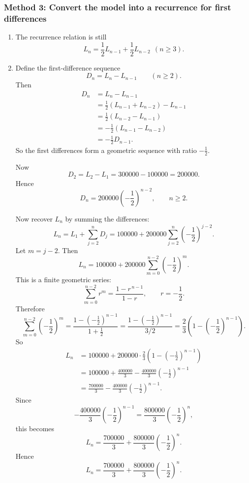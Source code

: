 \documentclass[12pt]{article}
\begin{document}
\subsubsection*{Method 3: Convert the model into a recurrence for first differences}
\begin{enumerate}[label=(\alph*)]
\item The recurrence relation is still
\[
\boxed{L_n=\frac12 L_{n-1}+\frac12 L_{n-2}\ \ (n\ge 3).}
\]

\item Define the first-difference sequence
\[
D_n=L_n-L_{n-1}\qquad (n\ge 2).
\]
Then
\begin{align*}
D_n
&=L_n-L_{n-1}\\
&=\frac12(L_{n-1}+L_{n-2})-L_{n-1}\\
&=\frac12(L_{n-2}-L_{n-1})\\
&=-\frac12(L_{n-1}-L_{n-2})\\
&=-\frac12 D_{n-1}.
\end{align*}
So the first differences form a geometric sequence with ratio \(-\tfrac12\).

Now
\[
D_2=L_2-L_1=300000-100000=200000.
\]
Hence
\[
D_n=200000\left(-\frac12\right)^{n-2}, \qquad n\ge 2.
\]

Now recover \(L_n\) by summing the differences:
\[
L_n=L_1+\sum_{j=2}^{n} D_j
=100000+200000\sum_{j=2}^{n}\left(-\frac12\right)^{j-2}.
\]
Let \(m=j-2\). Then
\[
L_n=100000+200000\sum_{m=0}^{n-2}\left(-\frac12\right)^m.
\]
This is a finite geometric series:
\[
\sum_{m=0}^{n-2}r^m=\frac{1-r^{\,n-1}}{1-r},
\qquad r=-\frac12.
\]
Therefore
\[
\sum_{m=0}^{n-2}\left(-\frac12\right)^m
=\frac{1-\left(-\frac12\right)^{n-1}}{1+\frac12}
=\frac{1-\left(-\frac12\right)^{n-1}}{3/2}
=\frac23\left(1-\left(-\frac12\right)^{n-1}\right).
\]
So
\begin{align*}
L_n
&=100000+200000\cdot \frac23\left(1-\left(-\frac12\right)^{n-1}\right)\\
&=100000+\frac{400000}{3}-\frac{400000}{3}\left(-\frac12\right)^{n-1}\\
&=\frac{700000}{3}-\frac{400000}{3}\left(-\frac12\right)^{n-1}.
\end{align*}
Since
\[
-\frac{400000}{3}\left(-\frac12\right)^{n-1}
=\frac{800000}{3}\left(-\frac12\right)^n,
\]
this becomes
\[
L_n=\frac{700000}{3}+\frac{800000}{3}\left(-\frac12\right)^n.
\]
Hence
\[
\boxed{L_n=\frac{700000}{3}+\frac{800000}{3}\left(-\frac12\right)^n.}
\]
\end{enumerate}
\end{document}
